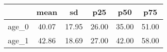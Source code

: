 {
\def\sym#1{\ifmmode^{#1}\else\(^{#1}\)\fi}
\begin{tabular}{l*{1}{ccccc}}
\toprule
                    &        mean&          sd&         p25&         p50&         p75\\
\midrule
age\_0               &       40.07&       17.95&       26.00&       35.00&       51.00\\
age\_1               &       42.86&       18.69&       27.00&       42.00&       58.00\\
\bottomrule
\end{tabular}
}
